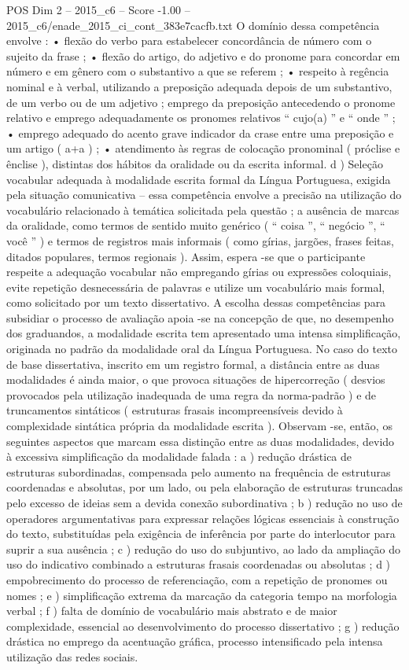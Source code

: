 \begin{textsample}{POS Dim 2 – 2015\_c6 – Score -1.00 – 2015\_c6/enade\_2015\_ci\_cont\_383e7cacfb.txt}
O domínio dessa competência envolve : • flexão do verbo para estabelecer concordância de número com o sujeito da frase ; • flexão do artigo, do adjetivo e do pronome para concordar em número e em gênero com o substantivo a que se referem ; • respeito à regência nominal e à verbal, utilizando a preposição adequada depois de um substantivo, de um verbo ou de um adjetivo ; emprego da preposição antecedendo o pronome relativo e emprego adequadamente os pronomes relativos “ cujo(a) ” e “ onde ” ; • emprego adequado do acento grave indicador da crase entre uma preposição e um artigo ( a+a ) ; • atendimento às regras de colocação pronominal ( próclise e ênclise ), distintas dos hábitos da oralidade ou da escrita informal. d ) Seleção vocabular adequada à modalidade escrita formal da Língua Portuguesa, exigida pela situação comunicativa – essa competência envolve a precisão na utilização do vocabulário relacionado à temática solicitada pela questão ; a ausência de marcas da oralidade, como termos de sentido muito genérico ( “ coisa ”, “ negócio ”, “ você ” ) e termos de registros mais informais ( como gírias, jargões, frases feitas, ditados populares, termos regionais ).
Assim, espera -se que o participante respeite a adequação vocabular não empregando gírias ou expressões coloquiais, evite repetição desnecessária de palavras e utilize um vocabulário mais formal, como solicitado por um texto dissertativo.
A escolha dessas competências para subsidiar o processo de avaliação apoia -se na concepção de que, no desempenho dos graduandos, a modalidade escrita tem apresentado uma intensa simplificação, originada no padrão da modalidade oral da Língua Portuguesa.
No caso do texto de base dissertativa, inscrito em um registro formal, a distância entre as duas modalidades é ainda maior, o que provoca situações de hipercorreção ( desvios provocados pela utilização inadequada de uma regra da norma-padrão ) e de truncamentos sintáticos ( estruturas frasais incompreensíveis devido à complexidade sintática própria da modalidade escrita ).
Observam -se, então, os seguintes aspectos que marcam essa distinção entre as duas modalidades, devido à excessiva simplificação da modalidade falada : a ) redução drástica de estruturas subordinadas, compensada pelo aumento na frequência de estruturas coordenadas e absolutas, por um lado, ou pela elaboração de estruturas truncadas pelo excesso de ideias sem a devida conexão subordinativa ; b ) redução no uso de operadores argumentativas para expressar relações lógicas essenciais à construção do texto, substituídas pela exigência de inferência por parte do interlocutor para suprir a sua ausência ; c ) redução do uso do subjuntivo, ao lado da ampliação do uso do indicativo combinado a estruturas frasais coordenadas ou absolutas ; d ) empobrecimento do processo de referenciação, com a repetição de pronomes ou nomes ; e ) simplificação extrema da marcação da categoria tempo na morfologia verbal ; f ) falta de domínio de vocabulário mais abstrato e de maior complexidade, essencial ao desenvolvimento do processo dissertativo ; g ) redução drástica no emprego da acentuação gráfica, processo intensificado pela intensa utilização das redes sociais.

\end{textsample}
